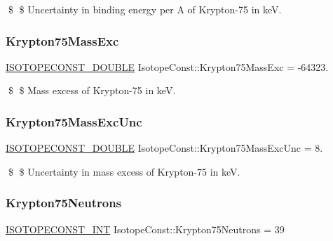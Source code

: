 \$ \$ Uncertainty in binding energy per A of Krypton-\/75 in keV. \mbox{\label{group___isotope_const-_krypton-_kr75_ga91bfe43103e22e92ef1f6cff28f8a32e}} 
\subsubsection{\texorpdfstring{Krypton75\+Mass\+Exc}{Krypton75MassExc}}
{\footnotesize\ttfamily \mbox{\hyperlink{group___isotope_const-_macros_ga8f45a7272ce02c0b4c65c44636ed719a}{I\+S\+O\+T\+O\+P\+E\+C\+O\+N\+S\+T\+\_\+\+D\+O\+U\+B\+LE}} Isotope\+Const\+::\+Krypton75\+Mass\+Exc = -\/64323.}

\$ \$ Mass excess of Krypton-\/75 in keV. \mbox{\label{group___isotope_const-_krypton-_kr75_ga328a21845885c16f3764b9394a933e75}} 
\subsubsection{\texorpdfstring{Krypton75\+Mass\+Exc\+Unc}{Krypton75MassExcUnc}}
{\footnotesize\ttfamily \mbox{\hyperlink{group___isotope_const-_macros_ga8f45a7272ce02c0b4c65c44636ed719a}{I\+S\+O\+T\+O\+P\+E\+C\+O\+N\+S\+T\+\_\+\+D\+O\+U\+B\+LE}} Isotope\+Const\+::\+Krypton75\+Mass\+Exc\+Unc = 8.}

\$ \$ Uncertainty in mass excess of Krypton-\/75 in keV. \mbox{\label{group___isotope_const-_krypton-_kr75_ga61bfbe85fb46f8e8a96bf9558651fda7}} 
\subsubsection{\texorpdfstring{Krypton75\+Neutrons}{Krypton75Neutrons}}
{\footnotesize\ttfamily \mbox{\hyperlink{group___isotope_const-_macros_ga5f18360b3e99483a35c32d789e62621c}{I\+S\+O\+T\+O\+P\+E\+C\+O\+N\+S\+T\+\_\+\+I\+NT}} Isotope\+Const\+::\+Krypton75\+Neutrons = 39}

